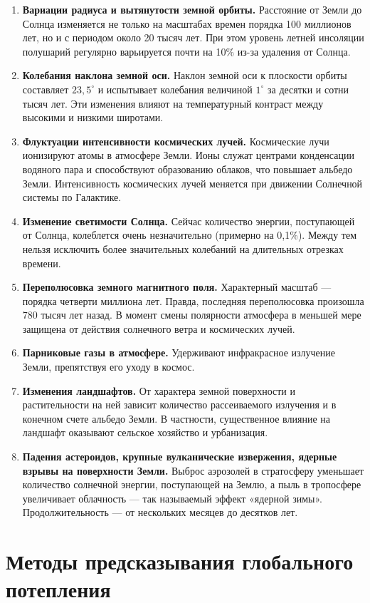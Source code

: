 \documentclass[a4paper,12pt]{ncc}
\begin{document}
 
 \begin{enumerate}
\item \textbf{Вариации радиуса и вытянутости земной орбиты.} Расстояние от Земли до Солнца изменяется не только на масштабах времен порядка 100 миллионов лет, но и с периодом около 20 тысяч лет. При этом уровень летней инсоляции полушарий регулярно варьируется почти на 10\% из-за удаления от Солнца. 
\item \textbf{Колебания наклона земной оси.} Наклон земной оси к плоскости орбиты составляет $23,5^\circ$ и испытывает колебания величиной $1^\circ$ за десятки и сотни тысяч лет. Эти изменения влияют на температурный контраст между высокими и низкими широтами. 
\item \textbf{Флуктуации интенсивности космических лучей.} Космические лучи ионизируют атомы в атмосфере Земли. Ионы служат центрами конденсации водяного пара и способствуют образованию облаков, что повышает альбедо Земли. Интенсивность космических лучей меняется при движении Солнечной системы по Галактике. 
\item \textbf{Изменение светимости Солнца.} Сейчас количество энергии, поступающей от Солнца, колеблется очень незначительно (примерно на 0,1\%). Между тем нельзя исключить более значительных колебаний на длительных отрезках времени. 
\item \textbf{Переполюсовка земного магнитного поля.} Характерный масштаб — порядка четверти миллиона лет. Правда, последняя переполюсовка произошла 780 тысяч лет назад. В момент смены полярности атмосфера в меньшей мере защищена от действия солнечного ветра и космических лучей. 
\item \textbf{Парниковые газы в атмосфере.} Удерживают инфракрасное излучение Земли, препятствуя его уходу в космос. 
\item \textbf{Изменения ландшафтов.} От характера земной поверхности и растительности на ней зависит количество рассеиваемого излучения и в конечном счете альбедо Земли. В частности, существенное влияние на ландшафт оказывают сельское хозяйство и урбанизация. 
\item \textbf{Падения астероидов, крупные вулканические извержения, ядерные взрывы на поверхности Земли.} Выброс аэрозолей в стратосферу уменьшает количество солнечной энергии, поступающей на Землю, а пыль в тропосфере увеличивает облачность — так называемый эффект «ядерной зимы». Продолжительность — от нескольких месяцев до десятков лет.
\end{enumerate}

 \section*{Методы предсказывания глобального потепления} %
 
\end{document}

